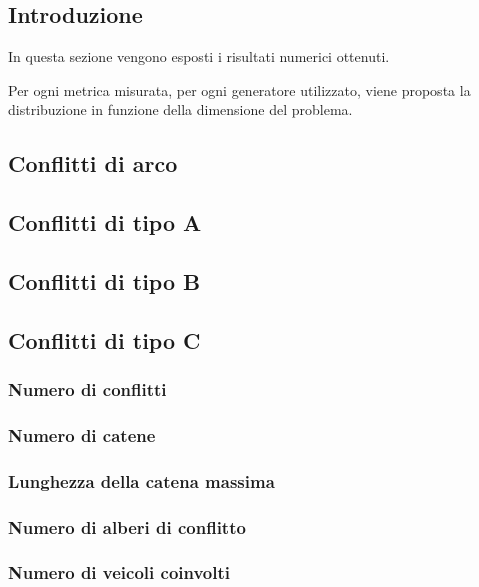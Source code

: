 \documentclass[../main.tex]{subfiles}
\begin{document}
\subsection{Introduzione}
In questa sezione vengono esposti i risultati numerici ottenuti.

Per ogni metrica misurata, per ogni generatore utilizzato, viene proposta la distribuzione in funzione della dimensione del problema.

\subsection{Conflitti di arco}

\subsection{Conflitti di tipo A}

\subsection{Conflitti di tipo B}

\subsection{Conflitti di tipo C}
\subsubsection{Numero di conflitti}

\subsubsection{Numero di catene}

\subsubsection{Lunghezza della catena massima}

\subsubsection{Numero di alberi di conflitto}

\subsubsection{Numero di veicoli coinvolti}
\end{document}
